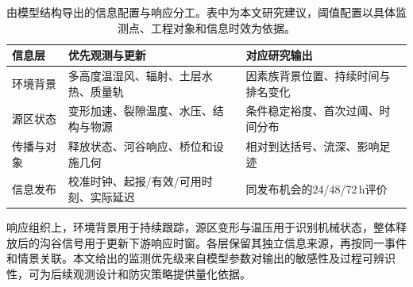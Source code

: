 \begin{table}[htbp]
\centering\small
\caption{由模型结构导出的信息配置与响应分工。表中为本文研究建议，阈值配置以具体监测点、工程对象和信息时效为依据。}\label{tab:common-response}
\begin{tabularx}{\linewidth}{p{2.35cm}Y Y}
\toprule
信息层 & 优先观测与更新 & 对应研究输出\\
\midrule
环境背景 & 多高度温湿风、辐射、土层水热、质量轨 & 因素族背景位置、持续时间与排名变化\\
源区状态 & 变形加速、裂隙温度、水压、结构与物源 & 条件稳定裕度、首次过阈、时间分布\\
传播与对象 & 释放状态、河谷响应、桥位和设施几何 & 相对到达括号、流深、影响足迹\\
信息发布 & 校准时钟、起报/有效/可用时刻、实际延迟 & 同发布机会的24/48/72\,h评价\\
\bottomrule
\end{tabularx}
\end{table}

响应组织上，环境背景用于持续跟踪，源区变形与温压用于识别机械状态，整体释放后的沟谷信号用于更新下游响应时窗。各层保留其独立信息来源，再按同一事件和情景关联。本文给出的监测优先级来自模型参数对输出的敏感性及过程可辨识性，可为后续观测设计和防灾策略提供量化依据。
\AIcredit
